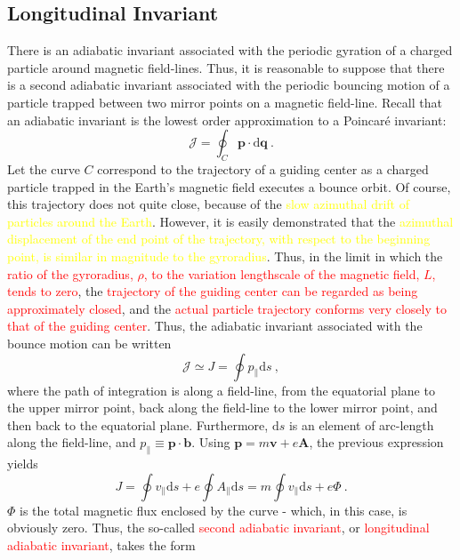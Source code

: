 \documentclass[12pt,a4paper]{article}
\renewcommand{\vec}[1]{\boldsymbol{#1}}
\newcommand{\dif}{\mathrm{d}}
\begin{document}
\subsection{Longitudinal Invariant}
\cite{Plasma2014} There is an adiabatic invariant associated with the periodic gyration of a charged particle around magnetic field-lines. Thus, it is reasonable to suppose that there is a second adiabatic invariant associated with the periodic bouncing motion of a particle trapped between two mirror points on a magnetic field-line. Recall that an adiabatic invariant is the lowest order approximation to a Poincar\'e invariant:
\begin{equation}
\mathcal J = \oint_C \vec{p} \cdot \dif \vec{q} ~.
\end{equation}
Let the curve $C$ correspond to the trajectory of a guiding center as a charged particle trapped in the Earth's magnetic field executes a bounce orbit. Of course, this trajectory does not quite close, because of the \textcolor{yellow}{slow azimuthal drift of particles around the Earth}. However, it is easily demonstrated that the \textcolor{yellow}{azimuthal displacement of the end point of the trajectory, with respect to the beginning point, is similar in magnitude to the gyroradius}. Thus, in the limit in which the \textcolor{red}{ratio of the gyroradius, $\rho$, to the variation lengthscale of the magnetic field, $L$, tends to zero}, the \textcolor{red}{trajectory of the guiding center can be regarded as being approximately closed}, and the \textcolor{red}{actual particle trajectory conforms very closely to that of the guiding center}. Thus, the adiabatic invariant associated with the bounce motion can be written
\begin{equation}
\mathcal J \simeq J = \oint p_\parallel \dif s ~,
\end{equation}
where the path of integration is along a field-line, from the equatorial plane to the upper mirror point, back along the field-line to the lower mirror point, and then back to the equatorial plane. Furthermore, $\dif s$ is an element of arc-length along the field-line, and $p_\parallel \equiv \vec{p}\cdot \vec{b}$. Using $\vec{p} = m\vec{v} + e \vec{A}$, the previous expression yields
\begin{equation}
 J = \oint v_\parallel \dif s +e \oint A_\parallel \dif s = m \oint v_\parallel \dif s +e \Phi ~.
\end{equation}
$\Phi$ is the total magnetic flux enclosed by the curve - which, in this case, is obviously zero. Thus, the so-called \textcolor{red}{second adiabatic invariant}, or \textcolor{red}{longitudinal adiabatic invariant}, takes the form
\end{document}
